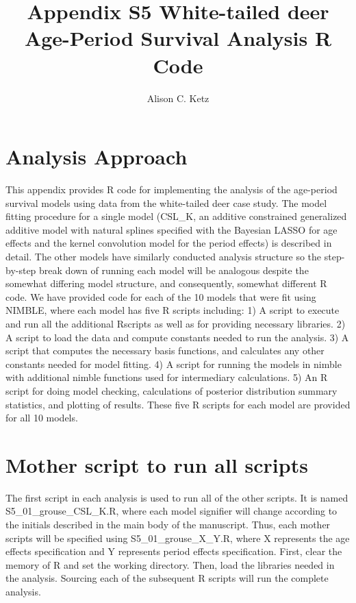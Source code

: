 \documentclass[11pt,]{article}
\title{Appendix S5 White-tailed deer Age-Period Survival Analysis R Code}
\author{Alison C. Ketz}
\date{}
\begin{document}
\maketitle

\section{Analysis Approach}\label{analysis-approach}

This appendix provides R code for implementing the analysis of the
age-period survival models using data from the white-tailed deer case
study. The model fitting procedure for a single model (CSL\_K, an
additive constrained generalized additive model with natural splines
specified with the Bayesian LASSO for age effects and the kernel
convolution model for the period effects) is described in detail. The
other models have similarly conducted analysis structure so the
step-by-step break down of running each model will be analogous despite
the somewhat differing model structure, and consequently, somewhat
different R code. We have provided code for each of the 10 models that
were fit using NIMBLE, where each model has five R scripts including: 1)
A script to execute and run all the additional Rscripts as well as for
providing necessary libraries. 2) A script to load the data and compute
constants needed to run the analysis. 3) A script that computes the
necessary basis functions, and calculates any other constants needed for
model fitting. 4) A script for running the models in nimble with
additional nimble functions used for intermediary calculations. 5) An R
script for doing model checking, calculations of posterior distribution
summary statistics, and plotting of results. These five R scripts for
each model are provided for all 10 models.

\section{Mother script to run all
scripts}\label{mother-script-to-run-all-scripts}

The first script in each analysis is used to run all of the other
scripts. It is named S5\_01\_grouse\_CSL\_K.R, where each model
signifier will change according to the initials described in the main
body of the manuscript. Thus, each mother scripts will be specified
using S5\_01\_grouse\_X\_Y.R, where X represents the age effects
specification and Y represents period effects specification. First,
clear the memory of R and set the working directory. Then, load the
libraries needed in the analysis. Sourcing each of the subsequent R
scripts will run the complete analysis.
\end{document}
